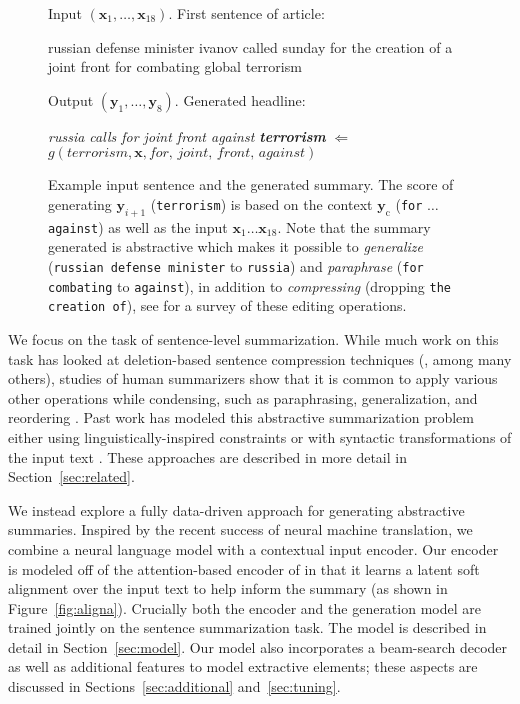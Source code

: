 \documentclass[11pt,a4paper]{article}
\newcommand{\xvec}{\mathbf{x}}
\newcommand{\yvec}{\mathbf{y}}
\newcommand{\context}{\mathbf{y}_{\mathrm{c}}}
\begin{document}
\begin{figure*}[t!]
  \small 
  \begin{framed}
    
    Input $(\xvec_1, \ldots, \xvec_{18})$. First sentence of article:
    
    russian defense minister ivanov called sunday for the creation of a joint front for combating global terrorism
    \vspace{0.1cm}
    
    Output $(\yvec_1, \ldots, \yvec_8)$. Generated headline:

    \textit{russia calls for joint front against \textbf{terrorism}}  \hspace*{0.5cm} $ \Leftarrow$ \hspace*{0.5cm} $g(\mathrm{\textit{terrorism}}, \xvec, \mathrm{\textit{for, joint, front, against}})$  
  \end{framed}
  \caption{\small \label{fig:sumex} Example input sentence and the generated summary. The score of generating $\yvec_{i+1}$
    (\texttt{terrorism}) is based on the context $\context$
    (\texttt{for} $\ldots$ \texttt{against}) as well as the input $\xvec_1 \ldots \xvec_{18}$. 
    Note that the summary generated is abstractive which makes it possible to \textit{generalize} (\texttt{russian defense minister} to \texttt{russia}) and \textit{paraphrase} (\texttt{for combating} to \texttt{against}), in addition to \textit{compressing}  (dropping \texttt{the creation of}), see  for a survey of these editing operations.}
\end{figure*}


We focus on the task of sentence-level summarization.
While much work on this task has looked at deletion-based sentence
compression techniques (, among many others), studies of
human summarizers show that it is common to apply various other
operations while condensing, such as paraphrasing, generalization, and reordering  \cite{jing2002using}. Past work has
modeled this abstractive summarization problem either using
linguistically-inspired constraints \cite{dorr2003hedge,zajic2004bbn}
or with syntactic transformations of the
input text \cite{cohn2008sentence,woodsend2010generation}.
These approaches are described in more detail in Section~\ref{sec:related}.


We instead explore a fully data-driven approach for generating
abstractive summaries. Inspired by the recent success
 of neural machine translation, we combine a neural
language model with a contextual input encoder. Our encoder
is modeled off of the attention-based encoder of
 in that it learns a latent soft alignment
over the input text to help inform the summary (as shown in Figure~\ref{fig:aligna}). Crucially both the
encoder and the generation model are trained jointly on the sentence
summarization task.  The model is described in detail in
Section~\ref{sec:model}. Our model also incorporates
a beam-search decoder as well as additional features to model extractive elements; these aspects are discussed in
Sections~\ref{sec:additional} and~\ref{sec:tuning}.
\end{document}
